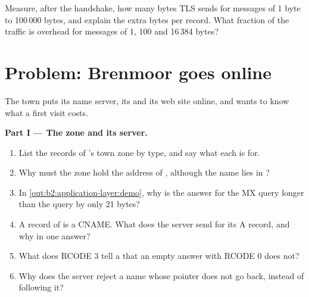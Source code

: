 \begin{exercise}[$\star\star\star$]\label{exo:b2:application-layer:12}
Measure, after the handshake, how many bytes TLS sends for messages of 1 byte to 100\,000 bytes, and explain the
extra bytes per record. What fraction of the traffic is overhead for messages of 1, 100 and 16\,384 bytes?
\end{exercise}

\section{Problem: Brenmoor goes online}\label{sec:b2:application-layer:problem}

\begin{problem}\label{pb:b2:application-layer:1}
The town puts its name server, its  and its web site online, and wants to know what a first visit costs.

\medskip\noindent\textbf{Part I --- The zone and its server.}\par\nopagebreak
\begin{enumerate}
\item List the records of 's town zone by type, and say what each is for.
\item Why must the zone  hold the address of , although the name lies in
?
\item In \cref{out:b2:application-layer:demo}, why is the answer for the MX query longer than the query by only 21
bytes?
\item A record of  is a CNAME. What does the server send for its A record, and why in one answer?
\item What does RCODE 3 tell a  that an empty answer with RCODE 0 does not?
\item Why does the server reject a name whose pointer does not go back, instead of following it?
\end{enumerate}


\end{problem}
